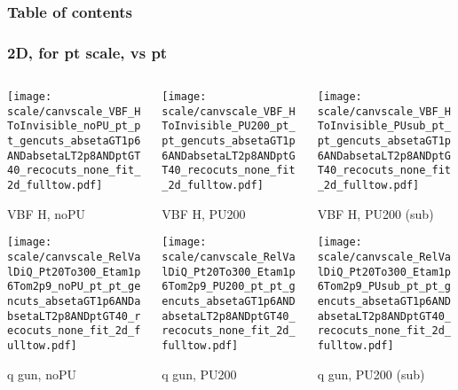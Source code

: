 \documentclass[8pt]{beamer}
\begin{document}
\begin{frame}
 \frametitle{Table of contents}
 
\end{frame}

\begin{frame}
  \frametitle{2D, for pt scale, vs pt}
  
  \begin{columns}
   \begin{column}{0.35\textwidth}
     \texttt{[image: scale/canvscale\_VBF\_HToInvisible\_noPU\_pt\_pt\_gencuts\_absetaGT1p6ANDabsetaLT2p8ANDptGT40\_recocuts\_none\_fit\_2d\_fulltow.pdf]}
     
     VBF H, noPU
    
     \texttt{[image: scale/canvscale\_RelValDiQ\_Pt20To300\_Etam1p6Tom2p9\_noPU\_pt\_pt\_gencuts\_absetaGT1p6ANDabsetaLT2p8ANDptGT40\_recocuts\_none\_fit\_2d\_fulltow.pdf]}
     
     q gun, noPU
   \end{column}
   \begin{column}{0.35\textwidth}
     \texttt{[image: scale/canvscale\_VBF\_HToInvisible\_PU200\_pt\_pt\_gencuts\_absetaGT1p6ANDabsetaLT2p8ANDptGT40\_recocuts\_none\_fit\_2d\_fulltow.pdf]}
     
     VBF H, PU200
    
     \texttt{[image: scale/canvscale\_RelValDiQ\_Pt20To300\_Etam1p6Tom2p9\_PU200\_pt\_pt\_gencuts\_absetaGT1p6ANDabsetaLT2p8ANDptGT40\_recocuts\_none\_fit\_2d\_fulltow.pdf]}
     
     q gun, PU200
   \end{column}
   \begin{column}{0.35\textwidth}
     \texttt{[image: scale/canvscale\_VBF\_HToInvisible\_PUsub\_pt\_pt\_gencuts\_absetaGT1p6ANDabsetaLT2p8ANDptGT40\_recocuts\_none\_fit\_2d\_fulltow.pdf]}
     
     VBF H, PU200 (sub)
    
     \texttt{[image: scale/canvscale\_RelValDiQ\_Pt20To300\_Etam1p6Tom2p9\_PUsub\_pt\_pt\_gencuts\_absetaGT1p6ANDabsetaLT2p8ANDptGT40\_recocuts\_none\_fit\_2d\_fulltow.pdf]}
     
     q gun, PU200 (sub)
   \end{column}
  \end{columns}
 \end{frame}
\end{document}
